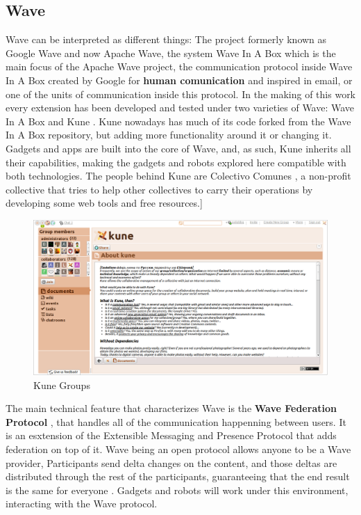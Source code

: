 \subsection{Wave}
Wave can be interpreted as different things: The project formerly known as Google Wave and now Apache Wave, the system Wave In A Box which is the main focus of the Apache Wave project, the communication protocol inside Wave In A Box created by Google for \textbf{human comunication} and inspired in email, or one of the units of communication inside this protocol. In the making of this work every extension has been developed and tested under two varieties of Wave: Wave In A Box and Kune \cite{ref:kune}. Kune nowadays has much of its code forked from the Wave In A Box repository, but adding more functionality around it or changing it. Gadgets and apps are built into the core of Wave, and, as such, Kune inherits all their capabilities, making the gadgets and robots explored here compatible with both technologies. The people behind Kune are Colectivo Comunes \cite{ref:comunes}, a non-profit collective that tries to help other collectives to carry their operations by developing some web tools and free resources.]
\begin{figure}[H]
  \center
    \includegraphics[keepaspectratio, scale=0.26]{Media/Captures/Wave/Kune_Groups.png}
  \caption{Kune Groups}
  \label{fig:kune_groups}
\end{figure}
The main technical feature that characterizes Wave is the \textbf{Wave Federation Protocol} \cite{ref:wave_federated_protocol}, that handles all of the communication happenning between users. It is an esxtension of the Extensible Messaging and Presence Protocol \cite{ref:xmpp} that adds federation on top of it. Wave being an open protocol allows anyone to be a Wave provider, Participants send delta changes on the content, and those deltas are distributed through the rest of the participants, guaranteeing that the end result is the same for everyone \cite{ref:federating_websites_google_wave}. Gadgets and robots will work under this environment, interacting with the Wave protocol.

